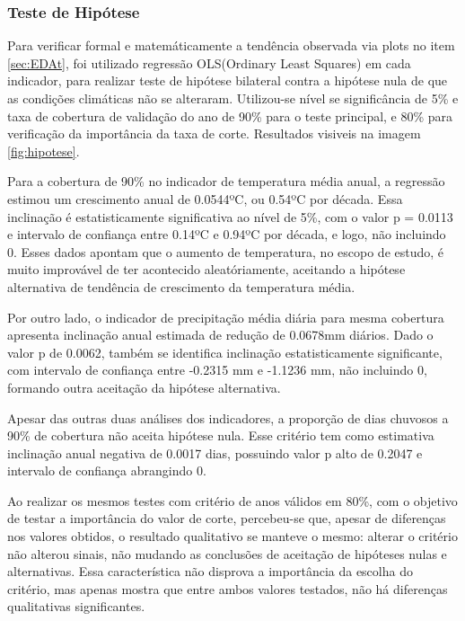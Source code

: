 \documentclass[pdflatex,sn-mathphys-num]{sn-jnl}%
\theoremstyle{thmstyleone}%
\theoremstyle{thmstyletwo}%
\theoremstyle{thmstylethree}%
\begin{document}
\FloatBarrier


\subsubsection{Teste de Hipótese}
\label{sec:hip}

Para verificar formal e matemáticamente a tendência observada via plots no item \ref{sec:EDAt}, foi utilizado regressão OLS(Ordinary Least Squares) em cada indicador, para realizar teste de hipótese bilateral contra a hipótese nula de que as condições climáticas não se alteraram. Utilizou-se nível se significância de 5\% e taxa de cobertura de validação do ano de 90\% para o teste principal, e 80\% para verificação da importância da taxa de corte. Resultados visiveis na imagem \ref{fig:hipotese}.

Para a cobertura de 90\% no indicador de temperatura média anual, a regressão estimou um crescimento anual de 0.0544ºC, ou 0.54ºC por década. Essa inclinação é estatisticamente significativa ao nível de 5\%, com o valor p = 0.0113 e intervalo de confiança entre 0.14ºC e 0.94ºC por década, e logo, não incluindo 0. Esses dados apontam que o aumento de temperatura, no escopo de estudo, é muito improvável de ter acontecido aleatóriamente, aceitando a hipótese alternativa de tendência de crescimento da temperatura média. 

Por outro lado, o indicador de precipitação média diária para mesma cobertura apresenta inclinação anual estimada de redução de 0.0678mm diários. Dado o valor p de 0.0062, também se identifica inclinação estatisticamente significante, com intervalo de confiança entre -0.2315 mm e -1.1236 mm, não incluindo 0, formando outra aceitação da hipótese alternativa.

Apesar das outras duas análises dos indicadores, a proporção de dias chuvosos a 90\% de cobertura não aceita hipótese nula. Esse critério tem como estimativa inclinação anual negativa de 0.0017 dias, possuindo valor p alto de 0.2047 e intervalo de confiança abrangindo 0.

Ao realizar os mesmos testes com critério de anos válidos em 80\%, com o objetivo de testar a importância do valor de corte, percebeu-se que, apesar de diferenças nos valores obtidos, o resultado qualitativo se manteve o mesmo: alterar o critério não alterou sinais, não mudando as conclusões de aceitação de hipóteses nulas e alternativas. Essa característica não disprova a importância da escolha do critério, mas apenas mostra que entre ambos valores testados, não há diferenças qualitativas significantes.
\end{document}
